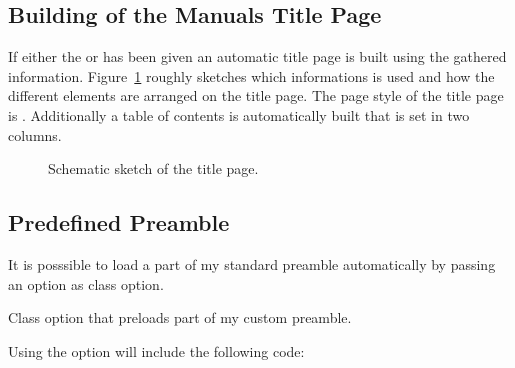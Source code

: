 \documentclass[load-preamble]{cnltx-doc}
\begin{document}
\subsection{Building of the Manuals Title Page}

If either the  or  has been given an automatic
title page is built using the gathered information. Figure~\ref{fig:titlepage}
roughly sketches which informations is used and how the different elements are
arranged on the title page.  The page style of the title page is
.  Additionally a  table of contents is automatically built that
is set in two columns.

\begin{figure}[htb]
  \centering
  \caption{Schematic sketch of the title page.}
  \label{fig:titlepage}
\end{figure}

\subsection{Predefined Preamble}\label{sec:preamble}

It is posssible to load a part of my standard preamble automatically by
passing an option as class option.
\begin{options}
    Class option that preloads part of my custom preamble.
\end{options}

Using the option will include the following code:

\begin{sourcecode}
  \RequirePackage[oldstyle]{libertine}
  \RequirePackage{libertinehologopatch}
  \RequirePackage[supstfm=libertinesups]{superiors}
  \RequirePackage{microtype}
  \RequirePackage[scaled=.83]{beramono}
  \RequirePackage{fnpct}
  \RequirePackage[english]{babel}
  \renewcommand*\othersectionlevelsformat[3]{%
    \textcolor{cnltx}{#3\autodot}\enskip}
  \renewcommand*\partformat{%
    \textcolor{cnltx}{\partname~\thepart\autodot}}
  \pagestyle{headings}
  \setcapindent{1.5em}
\end{sourcecode}
\end{document}
